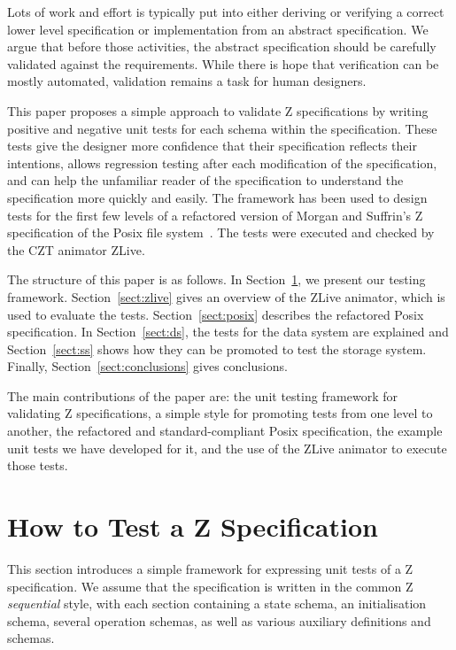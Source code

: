 \documentclass{llncs}
\begin{document}
Lots of work and effort is typically put into either deriving or
verifying a correct lower level specification or implementation from
an abstract specification.  We argue that before those activities, the
abstract specification should be carefully validated against the requirements.
While there is hope that verification can be mostly automated,
validation remains a task for human designers.

This paper proposes a simple approach to validate Z specifications by
writing positive and negative unit tests for each schema within the
specification.  These tests give the designer more confidence that
their specification reflects their intentions, allows regression
testing after each modification of the specification, and can help the
unfamiliar reader of the specification to understand the specification
more quickly and easily.  The framework has been used to design tests
for the first few levels of a refactored version of Morgan and
Suffrin's Z specification of the Posix file
system~\cite{MorSufTOSE84}.  The tests were executed and checked by
the CZT animator ZLive.

The structure of this paper is as follows.  In
Section~\ref{sect:framework}, we present our testing framework.
Section~\ref{sect:zlive} gives an overview of the ZLive animator,
which is used to evaluate the tests.  Section~\ref{sect:posix}
describes the refactored Posix specification.  In
Section~\ref{sect:ds}, the tests for the data system are explained
and Section~\ref{sect:ss} shows how they can be promoted to test
the storage system.  Finally, Section~\ref{sect:conclusions} gives
conclusions.

The main contributions of the paper are: the unit testing framework
for validating Z specifications, a simple style for promoting tests
from one level to another, the refactored and standard-compliant Posix
specification, the example unit tests we have developed for it, and
the use of the ZLive animator to execute those tests.


\section{How to Test a Z Specification}\label{sect:framework}

This section introduces a simple framework for expressing unit tests
of a Z specification.  We assume that the specification is written in
the common Z \emph{sequential} style, with each section containing a
state schema, an initialisation schema, several operation schemas, as
well as various auxiliary definitions and schemas.
\end{document}
